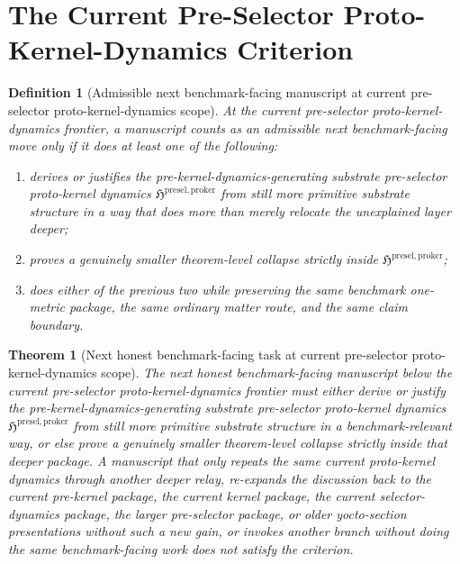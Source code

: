 \documentclass[11pt]{article}
\newcommand{\ProtoKernelPackage}{\mathfrak H^{\mathrm{presel,proker}}}
\newtheorem{definition}{Definition}
\newtheorem{theorem}{Theorem}
\begin{document}
\section{The Current Pre-Selector Proto-Kernel-Dynamics Criterion}

\begin{definition}[Admissible next benchmark-facing manuscript at current pre-selector proto-kernel-dynamics scope]
At the current pre-selector proto-kernel-dynamics frontier, a manuscript counts as an admissible next benchmark-facing move only if it does at least one of the following:
\begin{enumerate}
    \item derives or justifies the pre-kernel-dynamics-generating substrate pre-selector proto-kernel dynamics \(\ProtoKernelPackage\) from still more primitive substrate structure in a way that does more than merely relocate the unexplained layer deeper;
    \item proves a genuinely smaller theorem-level collapse strictly inside \(\ProtoKernelPackage\);
    \item does either of the previous two while preserving the same benchmark one-metric package, the same ordinary matter route, and the same claim boundary.
\end{enumerate}
\end{definition}

\begin{theorem}[Next honest benchmark-facing task at current pre-selector proto-kernel-dynamics scope]
The next honest benchmark-facing manuscript below the current pre-selector proto-kernel-dynamics frontier must either derive or justify the pre-kernel-dynamics-generating substrate pre-selector proto-kernel dynamics \(\ProtoKernelPackage\) from still more primitive substrate structure in a benchmark-relevant way, or else prove a genuinely smaller theorem-level collapse strictly inside that deeper package. A manuscript that only repeats the same current proto-kernel dynamics through another deeper relay, re-expands the discussion back to the current pre-kernel package, the current kernel package, the current selector-dynamics package, the larger pre-selector package, or older yocto-section presentations without such a new gain, or invokes another branch without doing the same benchmark-facing work does not satisfy the criterion.
\end{theorem}
\end{document}
